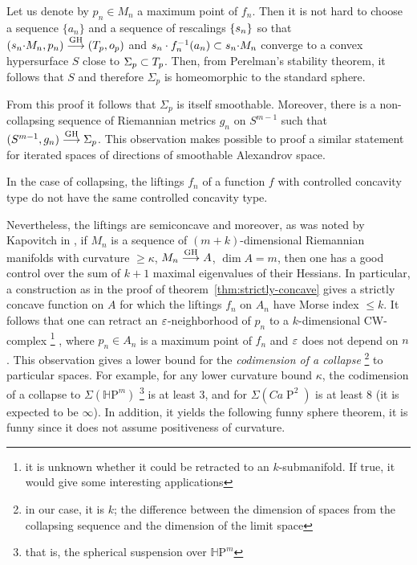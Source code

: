 \documentclass{article}
\begin{document}
Let us denote by $p_n\in M_n$ a maximum point of $f_n$.
Then it is not hard to choose a sequence $\{a_n\}$ and a sequence of rescalings
$\{s_n\}$ so that $(\lam_n{\cdot}M_n,p_n)\GHto (T_p,o_p)$ and 
$s_n\cdot f^{-1}_n(a_n)\subset s_n {\cdot}M_n$ converge to a
convex hypersurface $S$ close to $\Sigma_p\subset T_p$.
Then, from Perelman's stability theorem, it follows that $S$ and therefore $\Sigma_p$
is homeomorphic to the standard sphere.
\qeds

 From this proof it follows that $\Sigma_p$ is
itself smoothable. Moreover, there is a non-collapsing sequence of Riemannian metrics $g_n$ on $S^{m-1}$ such that $(S^{m-1},g_n)\GHto\Sigma_p$. 
This observation makes possible to proof a similar statement for iterated spaces of directions of smoothable Alexandrov space.

\bigskip

In the case of collapsing, the liftings $f_n$ of a function $f$ with controlled concavity
type do not have the same controlled concavity type.

Nevertheless, the liftings are semiconcave and moreover, as was noted by Kapovitch in
\cite{kapovitch:collapsing}, if
$M_n$ is a sequence of $(m+k)$-dimensional Riemannian manifolds with curvature $\ge
\kappa$, $M_n\GHto A$, $\dim A=m$, then one has a good control over the sum of
$k+1$ maximal eigenvalues of their Hessians. 
In particular, a construction as in the proof of theorem~\ref{thm:strictly-concave} gives a strictly concave function
on $A$ for which the liftings $f_n$ on $A_n$ have Morse index $\le k$.
It follows that one can retract an $\varepsilon$-neighborhood of $p_n$ to a $k$-dimensional CW-complex%
\footnote{it is unknown whether it could be retracted to an $k$-submanifold. If true, it would give some interesting applications}%
, where $p_n\in A_n$ is a maximum point of $f_n$ and $\varepsilon$ does not depend on $n$.
This observation gives a lower bound for the \emph{codimension of
a collapse}%
\footnote{in our case, it is $k$; the difference between the dimension of spaces from the collapsing sequence and the dimension of the limit space} 
to particular spaces. 
For example, for any lower curvature bound $\kappa$, the codimension of a collapse to $\Sigma(\mathbb H\mathrm P^m)$%
\footnote{that is, the spherical suspension over $\mathbb H\mathrm P^m$} 
is
at least 3, and for $\Sigma(C a\! \operatorname{P}^2)$  is at least 8 (it is expected to be $\infty$). 
In addition, it yields the following funny sphere theorem, 
it is funny since it does not assume positiveness of curvature.
\end{document}
